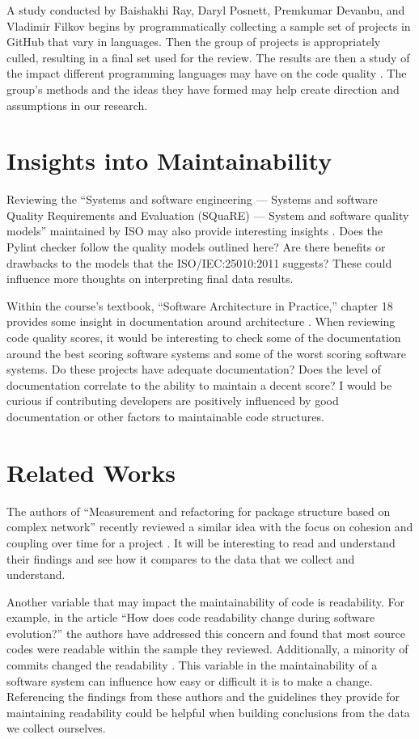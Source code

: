 \documentclass[conference]{IEEEtran}
\begin{document}
A study conducted by Baishakhi Ray, Daryl Posnett, Premkumar Devanbu, and Vladimir Filkov begins by programmatically collecting a sample set of projects in GitHub that vary in languages. Then the group of projects is appropriately culled, resulting in a final set used for the review. The results are then a study of the impact different programming languages may have on the code quality \cite{baishakhi:2017}. The group's methods and the ideas they have formed may help create direction and assumptions in our research.

\section{Insights into Maintainability}

Reviewing the ``Systems and software engineering — Systems and software Quality Requirements and Evaluation (SQuaRE) — System and software quality models'' maintained by ISO may also provide interesting insights \cite{iso/iec:25010:2011}. Does the Pylint checker follow the quality models outlined here? Are there benefits or drawbacks to the models that the ISO/IEC:25010:2011 suggests? These could influence more thoughts on interpreting final data results.

Within the course's textbook, ``Software Architecture in Practice,'' chapter 18 provides some insight in documentation around architecture \cite{book:software-architecture-in-practice}. When reviewing code quality scores, it would be interesting to check some of the documentation around the best scoring software systems and some of the worst scoring software systems. Do these projects have adequate documentation? Does the level of documentation correlate to the ability to maintain a decent score? I would be curious if contributing developers are positively influenced by good documentation or other factors to maintainable code structures.

\section{Related Works}

The authors of ``Measurement and refactoring for package structure based on complex network'' recently reviewed a similar idea with the focus on cohesion and coupling over time for a project \cite{zhou:2020}. It will be interesting to read and understand their findings and see how it compares to the data that we collect and understand.

Another variable that may impact the maintainability of code is readability. For example, in the article ``How does code readability change during software evolution?'' the authors have addressed this concern and found that most source codes were readable within the sample they reviewed. Additionally, a minority of commits changed the readability \cite{piantadosi:2020}. This variable in the maintainability of a software system can influence how easy or difficult it is to make a change. Referencing the findings from these authors and the guidelines they provide for maintaining readability could be helpful when building conclusions from the data we collect ourselves.
\end{document}

